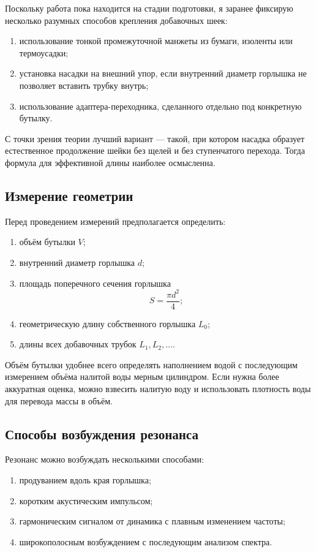 \documentclass[a4paper,12pt]{article}
\begin{document}
	Поскольку работа пока находится на стадии подготовки, я заранее фиксирую несколько разумных способов крепления добавочных шеек:
	\begin{enumerate}[label=\arabic*)]
		\item использование тонкой промежуточной манжеты из бумаги, изоленты или термоусадки;
		\item установка насадки на внешний упор, если внутренний диаметр горлышка не позволяет вставить трубку внутрь;
		\item использование адаптера-переходника, сделанного отдельно под конкретную бутылку.
	\end{enumerate}
	
	С точки зрения теории лучший вариант --- такой, при котором насадка образует естественное продолжение шейки без щелей и без ступенчатого перехода. Тогда формула для эффективной длины наиболее осмысленна.
	
	\subsection{Измерение геометрии}
	
	Перед проведением измерений предполагается определить:
	\begin{enumerate}[label=\arabic*)]
		\item объём бутылки \(V\);
		\item внутренний диаметр горлышка \(d\);
		\item площадь поперечного сечения горлышка
		\[
		S=\frac{\pi d^2}{4};
		\]
		\item геометрическую длину собственного горлышка \(L_0\);
		\item длины всех добавочных трубок \(L_1,L_2,\dots\).
	\end{enumerate}
	
	Объём бутылки удобнее всего определять наполнением водой с последующим измерением объёма налитой воды мерным цилиндром. Если нужна более аккуратная оценка, можно взвесить налитую воду и использовать плотность воды для перевода массы в объём.
	
	\subsection{Способы возбуждения резонанса}
	
	Резонанс можно возбуждать несколькими способами:
	\begin{enumerate}[label=\arabic*)]
		\item продуванием вдоль края горлышка;
		\item коротким акустическим импульсом;
		\item гармоническим сигналом от динамика с плавным изменением частоты;
		\item широкополосным возбуждением с последующим анализом спектра.
	\end{enumerate}
	
\end{document}
